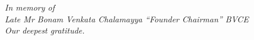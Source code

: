 \newpage

\hspace{0pt}
\vfill


\noindent\hrulefill

\begin{center}
\textit{In memory of}\\[0.5cm]
\textit{Late Mr Bonam Venkata Chalamayya ``Founder Chairman'' BVCE}\\[0.5cm]
\textit{Our deepest gratitude.}
\end{center}

\noindent\hrulefill


\vfill
\hspace{0pt}